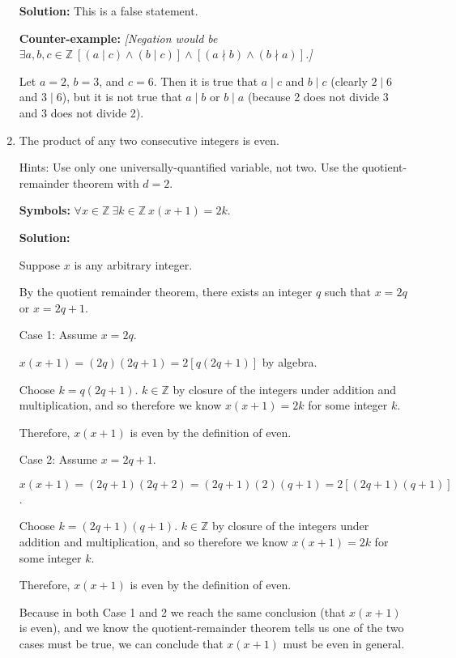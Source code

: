 \documentclass[12pt, letterpaper]{report}
\newcommand{\Z}{\mathbb{Z}}
\newcommand{\indentpar}{\addtolength{\leftskip}{5mm}}
\newcommand{\stopindentpar}{\addtolength{\leftskip}{-5mm}}
\begin{document}
\begin{enumerate}
        \textbf{Solution:} This is a false statement.

\textbf{Counter-example:}  \textit{[Negation would be $\exists a, b, c \in \Z \ [(a \mid c) \land (b \mid c)] \land [(a \nmid b) \land (b \nmid a)]$.]}

Let $a=2$, $b=3$, and $c=6$.  Then it is true that $a\mid c$ and
$b \mid c$ (clearly $2 \mid 6$ and $3 \mid 6$), but it is not true that $a \mid b$ or $b \mid a$
(because 2 does not divide 3 and 3 does not divide 2).

        
        \item The product of any two consecutive integers is even.  
        
        Hints:  Use only one universally-quantified variable, not two.  Use the quotient-remainder theorem with $d=2$.
        
        
        
                        \textbf{Symbols:} $\forall x \in \Z \ \exists k \in \Z \ x(x+1)=2k$.

        \textbf{Solution:}

        Suppose $x$ is any arbitrary integer.

        By the quotient remainder theorem, there exists an integer $q$ such that $x=2q$ or $x=2q+1$.

        Case 1: Assume $x=2q$.

\indentpar
$x(x+1)=(2q)(2q+1) = 2[q(2q+1)]$ by algebra.

Choose $k=q(2q+1)$.  $k \in \Z$ by closure of the integers under addition and multiplication, and so therefore
we know $x(x+1)=2k$ for some integer $k$.

Therefore, $x(x+1)$ is even by the definition of even.

\stopindentpar
Case 2: Assume $x=2q+1$.

\indentpar
$x(x+1) = (2q+1)(2q+2) = (2q+1)(2)(q+1) = 2[(2q+1)(q+1)]$.

Choose $k=(2q+1)(q+1)$.  $k \in \Z$ by closure of the integers under addition and multiplication, and so therefore
we know $x(x+1)=2k$ for some integer $k$.

Therefore, $x(x+1)$ is even by the definition of even.

\stopindentpar


Because in both Case 1 and 2 we reach the same conclusion (that $x(x+1)$ is even),
and we know the quotient-remainder theorem tells us one of the two cases must be true, 
we can conclude that $x(x+1)$ must be even in general.
        

\end{enumerate}
\end{document}
